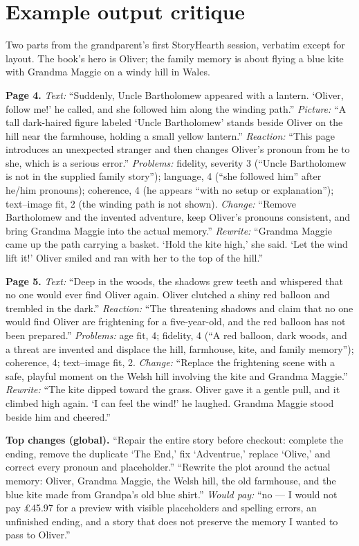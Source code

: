 \documentclass[10pt,twocolumn]{article}
\newcommand{\site}{StoryHearth}
\begin{document}
\section{Example output critique}
\label{app:example}

Two parts from the grandparent's first \site{} session, verbatim except for layout. The book's hero is Oliver; the family memory is about flying a blue kite with Grandma Maggie on a windy hill in Wales.

\medskip
\noindent\textbf{Page 4.} \emph{Text:} ``Suddenly, Uncle Bartholomew appeared with a lantern. `Oliver, follow me!' he called, and she followed him along the winding path.'' \emph{Picture:} ``A tall dark-haired figure labeled `Uncle Bartholomew' stands beside Oliver on the hill near the farmhouse, holding a small yellow lantern.'' \emph{Reaction:} ``This page introduces an unexpected stranger and then changes Oliver's pronoun from he to she, which is a serious error.'' \emph{Problems:} fidelity, severity 3 (``Uncle Bartholomew is not in the supplied family story''); language, 4 (``she followed him'' after he/him pronouns); coherence, 4 (he appears ``with no setup or explanation''); text--image fit, 2 (the winding path is not shown). \emph{Change:} ``Remove Bartholomew and the invented adventure, keep Oliver's pronouns consistent, and bring Grandma Maggie into the actual memory.'' \emph{Rewrite:} ``Grandma Maggie came up the path carrying a basket. `Hold the kite high,' she said. `Let the wind lift it!' Oliver smiled and ran with her to the top of the hill.''

\medskip
\noindent\textbf{Page 5.} \emph{Text:} ``Deep in the woods, the shadows grew teeth and whispered that no one would ever find Oliver again. Oliver clutched a shiny red balloon and trembled in the dark.'' \emph{Reaction:} ``The threatening shadows and claim that no one would find Oliver are frightening for a five-year-old, and the red balloon has not been prepared.'' \emph{Problems:} age fit, 4; fidelity, 4 (``A red balloon, dark woods, and a threat are invented and displace the hill, farmhouse, kite, and family memory''); coherence, 4; text--image fit, 2. \emph{Change:} ``Replace the frightening scene with a safe, playful moment on the Welsh hill involving the kite and Grandma Maggie.'' \emph{Rewrite:} ``The kite dipped toward the grass. Oliver gave it a gentle pull, and it climbed high again. `I can feel the wind!' he laughed. Grandma Maggie stood beside him and cheered.''

\medskip
\noindent\textbf{Top changes (global).} ``Repair the entire story before checkout: complete the ending, remove the duplicate `The End,' fix `Adventrue,' replace `Olive,' and correct every pronoun and placeholder.'' ``Rewrite the plot around the actual memory: Oliver, Grandma Maggie, the Welsh hill, the old farmhouse, and the blue kite made from Grandpa's old blue shirt.'' \emph{Would pay:} ``no --- I would not pay \pounds45.97 for a preview with visible placeholders and spelling errors, an unfinished ending, and a story that does not preserve the memory I wanted to pass to Oliver.''
\end{document}
